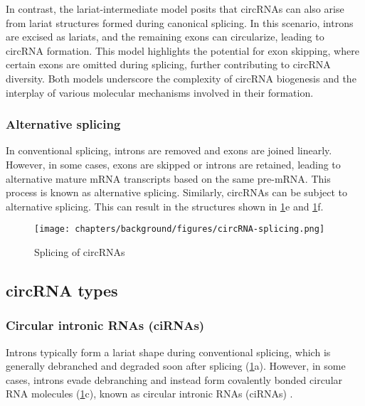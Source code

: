 In contrast, the lariat-intermediate model posits that circRNAs can also arise
from lariat structures formed during canonical splicing.
In this scenario, introns are excised as lariats, and the remaining exons can
circularize, leading to circRNA
formation\supercite{humphreys_ularcirc_2019,barrett_circular_2015}.
This model highlights the potential for exon skipping, where certain exons are
omitted during splicing, further contributing to circRNA
diversity\supercite{sun_microarray_2020,barrett_circular_2015}.
Both models underscore the complexity of circRNA biogenesis and the interplay
of various molecular mechanisms involved in their
formation\supercite{sharma_recent_2021}.


\subsubsection{Alternative splicing}
In conventional splicing, introns are removed and exons are joined linearly.
However, in some cases, exons are skipped or introns are retained, leading to
alternative mature mRNA transcripts based on the same pre-mRNA.
This process is known as alternative splicing\supercite{nilsen_expansion_2010}.
Similarly, circRNAs can be subject to alternative splicing.
This can result in the structures shown in \cref{fig:circRNA_splicing}e and
\cref{fig:circRNA_splicing}f.

\begin{figure}[ht]
    \centering

    \texttt{[image: chapters/background/figures/circRNA-splicing.png]}
    \caption{Splicing of circRNAs} %
    \label{fig:circRNA_splicing}
\end{figure}

\subsection{circRNA types}
\iffalse
    \subsubsection{Circular intronic RNAs (ciRNAs)}
    Introns typically form a lariat shape during conventional splicing, which is
    generally debranched and degraded soon after splicing
    (\cref{fig:circRNA_splicing}a).
    However, in some cases, introns evade debranching and instead form covalently
    bonded circular RNA molecules (\cref{fig:circRNA_splicing}c), known as circular
    intronic RNAs (ciRNAs) \supercite{chen_expanding_2020,zhang_circular_2013}.

